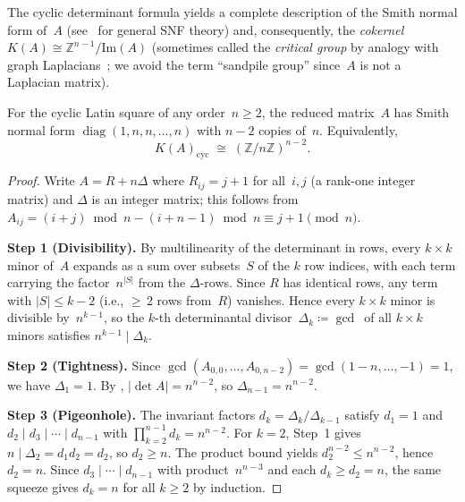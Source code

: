 \documentclass[11pt,a4paper]{article}
\newcommand{\ZZ}{\mathbb{Z}}
\begin{document}
The cyclic determinant formula yields a complete description of the
Smith normal form of~$A$ (see~\cite{Newman72} for general SNF theory)
and, consequently, the \emph{cokernel}
$K(A)\cong\ZZ^{n-1}/\mathrm{Im}(A)$
(sometimes called the \emph{critical group} by analogy with graph
Laplacians~\cite{Biggs99}; we avoid the term ``sandpile group''
since~$A$ is not a Laplacian matrix).

\begin{corollary}\label{cor:sandpile-cyclic}
For the cyclic Latin square of any order~$n\ge 2$, the reduced matrix~$A$
has Smith normal form $\operatorname{diag}(1,n,n,\dots,n)$ with $n-2$
copies of~$n$.  Equivalently,
\[
  K(A)_{\mathrm{cyc}} \;\cong\; (\ZZ/n\ZZ)^{n-2}.
\]
\end{corollary}

\begin{proof}
Write $A=R+n\Delta$ where $R_{ij}=j+1$ for all~$i,j$ (a rank-one
integer matrix) and $\Delta$ is an integer matrix; this follows from
$A_{ij}=(i{+}j)\bmod n - (i{+}n{-}1)\bmod n \equiv j+1\pmod{n}$.

\medskip\noindent\textbf{Step 1 (Divisibility).}
By multilinearity of the determinant in rows, every $k\times k$ minor
of~$A$ expands as a sum over subsets~$S$ of the $k$ row indices, with
each term carrying the factor~$n^{|S|}$ from the $\Delta$-rows.
Since $R$ has identical rows, any term with $|S|\le k-2$ (i.e.,
${\ge}\,2$ rows from~$R$) vanishes.  Hence every $k\times k$ minor is
divisible by~$n^{k-1}$, so the $k$-th determinantal
divisor~$\Delta_k\coloneqq\gcd$~of all $k\times k$ minors satisfies
$n^{k-1}\mid\Delta_k$.

\medskip\noindent\textbf{Step 2 (Tightness).}
Since $\gcd(A_{0,0},\dots,A_{0,n-2})=\gcd(1{-}n,\dots,-1)=1$,
we have $\Delta_1=1$.
By ,
$|\det A|=n^{n-2}$, so $\Delta_{n-1}=n^{n-2}$.

\medskip\noindent\textbf{Step 3 (Pigeonhole).}
The invariant factors $d_k=\Delta_k/\Delta_{k-1}$ satisfy $d_1=1$ and
$d_2\mid d_3\mid\cdots\mid d_{n-1}$ with $\prod_{k=2}^{n-1}d_k
=n^{n-2}$.  For $k=2$, Step~1 gives $n\mid\Delta_2=d_1 d_2=d_2$,
so $d_2\ge n$.  The product bound yields $d_2^{n-2}\le n^{n-2}$,
hence $d_2=n$.  Since $d_3\mid\cdots\mid d_{n-1}$ with
product~$n^{n-3}$ and each $d_k\ge d_2=n$, the same squeeze
gives $d_k=n$ for all $k\ge 2$ by induction.
\end{proof}

\end{document}
